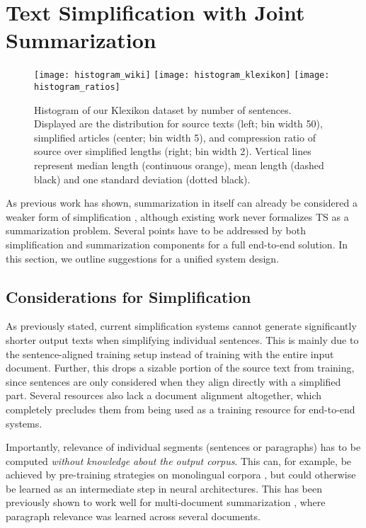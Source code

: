 \documentclass[10pt, a4paper]{article}
\begin{document}
\section{Text Simplification with Joint Summarization}

\begin{figure*}[ht]
	\centering
	\texttt{[image: histogram\_wiki]}
	\texttt{[image: histogram\_klexikon]}
	\texttt{[image: histogram\_ratios]}
	\caption{Histogram of our Klexikon dataset by number of sentences. Displayed are the distribution for source texts (left; bin width 50), simplified articles (center; bin width 5), and compression ratio of source over simplified lengths (right; bin width 2). Vertical lines represent median length (continuous orange), mean length (dashed black) and one standard deviation (dotted black).}
	\label{fig:stats}
\end{figure*}

As previous work has shown, summarization in itself can already be considered a weaker form of simplification \cite{margarido2008automatic,smith-jonsson-2011-automatic}, although existing work never formalizes TS as a summarization problem.
Several points have to be addressed by both simplification and summarization components for a full end-to-end solution. In this section, we outline suggestions for a unified system design.



\subsection{Considerations for Simplification}
As previously stated, current simplification systems cannot generate significantly shorter output texts when simplifying individual sentences. 
This is mainly due to the sentence-aligned training setup instead of training with the entire input document. 
Further, this drops a sizable portion of the source text from training, since sentences are only considered when they align directly with a simplified part.
Several resources also lack a document alignment altogether, which completely precludes them from being used as a training resource for end-to-end systems.

Importantly, relevance of individual segments (sentences or paragraphs) has to be computed \emph{without knowledge about the output corpus}.
This can, for example, be achieved by pre-training strategies on monolingual corpora \cite{mallinson-etal-2020-zero}, but could otherwise be learned as an intermediate step in neural architectures.
This has been previously shown to work well for multi-document summarization \cite{liu-lapata-2019-hierarchical}, where paragraph relevance was learned across several documents.
\end{document}
